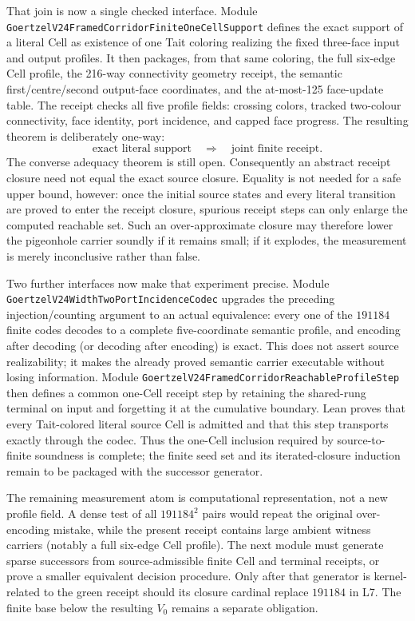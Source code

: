 \documentclass[11pt]{article}
\theoremstyle{definition}
\begin{document}
That join is now a single checked interface.  Module
\texttt{GoertzelV24FramedCorridorFiniteOneCellSupport} defines the exact
support of a literal Cell as existence of one Tait coloring realizing the
fixed three-face input and output profiles.  It then packages, from that same
coloring, the full six-edge Cell profile, the 216-way connectivity geometry
receipt, the semantic first/centre/second output-face coordinates, and the
at-most-125 face-update table.  The receipt checks all five profile fields:
crossing colors, tracked two-colour connectivity, face identity, port
incidence, and capped face progress.  The resulting theorem is deliberately
one-way:
\[
  \text{exact literal support}\quad\Longrightarrow\quad
  \text{joint finite receipt}.
\]
The converse adequacy theorem is still open.  Consequently an abstract
receipt closure need not equal the exact source closure.  Equality is not
needed for a safe upper bound, however: once the initial source states and
every literal transition are proved to enter the receipt closure, spurious
receipt steps can only enlarge the computed reachable set.  Such an
over-approximate closure may therefore lower the pigeonhole carrier soundly
if it remains small; if it explodes, the measurement is merely inconclusive
rather than false.

Two further interfaces now make that experiment precise.  Module
\texttt{GoertzelV24WidthTwoPortIncidenceCodec} upgrades the preceding
injection/counting argument to an actual equivalence: every one of the
$191184$ finite codes decodes to a complete five-coordinate semantic profile,
and encoding after decoding (or decoding after encoding) is exact.  This does
not assert source realizability; it makes the already proved semantic carrier
executable without losing information.  Module
\texttt{GoertzelV24FramedCorridorReachableProfileStep} then defines a common
one-Cell receipt step by retaining the shared-rung terminal on input and
forgetting it at the cumulative boundary.  Lean proves that every Tait-colored
literal source Cell is admitted and that this step transports exactly through
the codec.  Thus the one-Cell inclusion required by source-to-finite
soundness is complete; the finite seed set and its iterated-closure induction
remain to be packaged with the successor generator.

The remaining measurement atom is computational representation, not a new
profile field.  A dense test of all $191184^2$ pairs would repeat the original
over-encoding mistake, while the present receipt contains large ambient
witness carriers (notably a full six-edge Cell profile).  The next module must
generate sparse successors from source-admissible finite Cell and terminal
receipts, or prove a smaller equivalent decision procedure.  Only after that
generator is kernel-related to the green receipt should its closure cardinal
replace $191184$ in L7.  The finite base below the resulting $V_0$ remains a
separate obligation.
\end{document}
